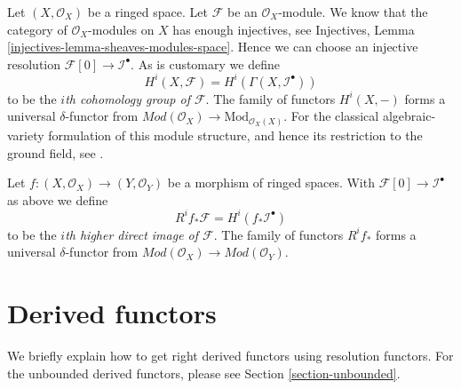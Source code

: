 \medskip\noindent
Let $(X, \mathcal{O}_X)$ be a ringed space. Let $\mathcal{F}$ be an
$\mathcal{O}_X$-module. We know that the category of $\mathcal{O}_X$-modules
on $X$ has enough injectives, see
Injectives, Lemma \ref{injectives-lemma-sheaves-modules-space}.
Hence we can choose an injective resolution
$\mathcal{F}[0] \to \mathcal{I}^\bullet$. As is customary we define
\begin{equation}
\label{equation-cohomology-modules}
H^i(X, \mathcal{F}) = H^i(\Gamma(X, \mathcal{I}^\bullet))
\end{equation}
to be the {\it $i$th cohomology group of $\mathcal{F}$}.
The family of functors $H^i(X, -)$ forms a universal $\delta$-functor
from $\textit{Mod}(\mathcal{O}_X) \to \text{Mod}_{\mathcal{O}_X(X)}$.
For the classical algebraic-variety formulation of this module structure,
and hence its restriction to the ground field, see
\cite[Chapter II, \S 2, no. 38, p. 231]{FAC}.

\medskip\noindent
Let $f : (X, \mathcal{O}_X) \to (Y, \mathcal{O}_Y)$ be a morphism of ringed
spaces. With $\mathcal{F}[0] \to \mathcal{I}^\bullet$ as above
we define
\begin{equation}
\label{equation-higher-direct-image-modules}
R^if_*\mathcal{F} = H^i(f_*\mathcal{I}^\bullet)
\end{equation}
to be the {\it $i$th higher direct image of $\mathcal{F}$}.
The family of functors $R^if_*$ forms a universal $\delta$-functor
from $\textit{Mod}(\mathcal{O}_X) \to \textit{Mod}(\mathcal{O}_Y)$.





\section{Derived functors}
\label{section-derived-functors}

\noindent
We briefly explain how to get right derived functors using resolution
functors. For the unbounded derived functors, please see
Section \ref{section-unbounded}.

